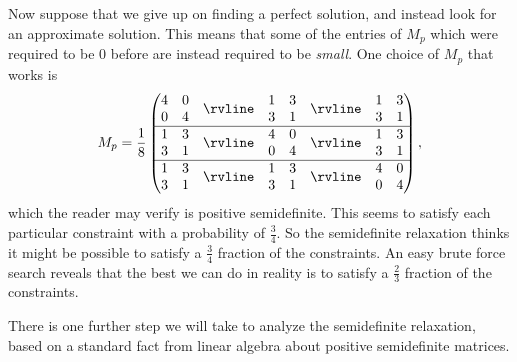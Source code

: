 \begin{ex}
Now suppose that we give up on finding a perfect solution, and instead look for an approximate solution. This means that some of the entries of $M_p$ which were required to be $0$ before are instead required to be \emph{small}. One choice of $M_p$ that works is
\[
M_p = \frac{1}{8}\begin{pmatrix}\begin{matrix} 4 & 0\\ 0 & 4\end{matrix} & \rvline & \begin{matrix} 1 & 3\\ 3 & 1\end{matrix} & \rvline & \begin{matrix} 1 & 3\\ 3 & 1\end{matrix}\\
\hline \begin{matrix} 1 & 3\\ 3 & 1\end{matrix} & \rvline & \begin{matrix} 4 & 0\\ 0 & 4\end{matrix} & \rvline & \begin{matrix} 1 & 3\\ 3 & 1\end{matrix}\\
\hline \begin{matrix} 1 & 3\\ 3 & 1\end{matrix} & \rvline & \begin{matrix} 1 & 3\\ 3 & 1\end{matrix} & \rvline & \begin{matrix} 4 & 0\\ 0 & 4\end{matrix}\end{pmatrix},
\]
which the reader may verify is positive semidefinite. This seems to satisfy each particular constraint with a probability of $\frac{3}{4}$. So the semidefinite relaxation thinks it might be possible to satisfy a $\frac{3}{4}$ fraction of the constraints. An easy brute force search reveals that the best we can do in reality is to satisfy a $\frac{2}{3}$ fraction of the constraints.
\end{ex}

There is one further step we will take to analyze the semidefinite relaxation, based on a standard fact from linear algebra about positive semidefinite matrices.

